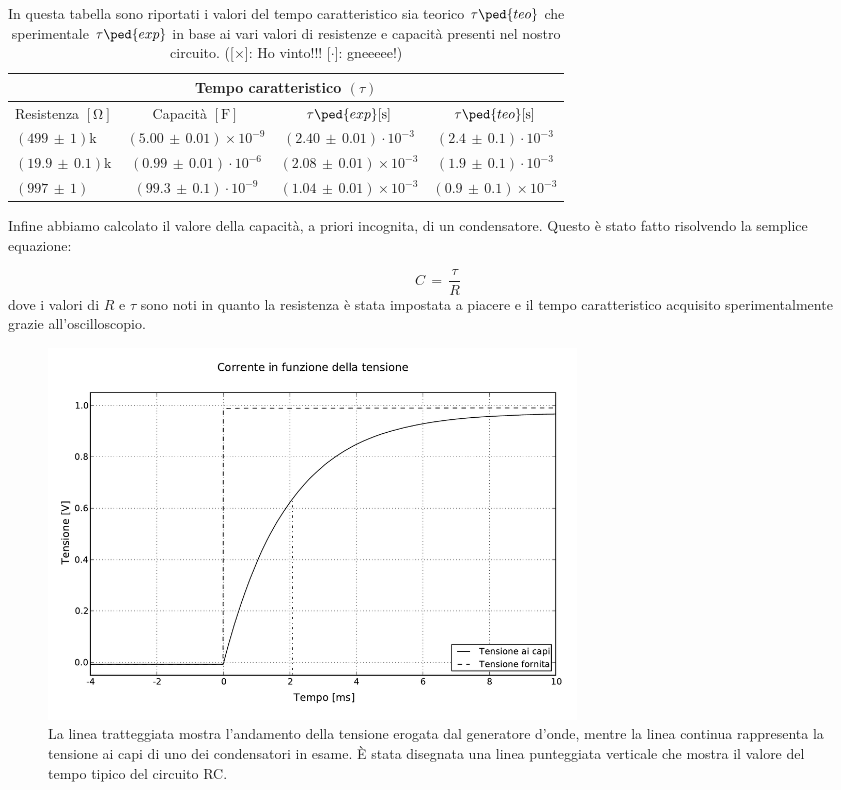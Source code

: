 \begin{table}[H]
  \centering
  \begin{tabular}{l | c c c}
      \multicolumn{4}{c}{\textbf{Tempo caratteristico $(\tau)$}} \\
      \toprule
      Resistenza $[\si{\ohm}]$ & Capacità $[\si{\farad}]$ & $\tau\ped{exp} [\si{\second}]$ & $\tau\ped{teo} [\si{\second}]$ \\
      \midrule
      $(499\,\pm\,1)$k   &  $(5.00\,\pm\,0.01)\times10^{-9}$ 	& $ (2.40\,\pm\,0.01)\cdot10^{-3}$ 		& $(2.4\,\pm\,0.1)\cdot10^{-3}$ \\
      $(19.9\,\pm\,0.1)$k  &  $(0.99\,\pm\,0.01)\cdot10^{-6}$ 		& $ (2.08\,\pm\,0.01)\times10^{-3}$ 	& $(1.9\,\pm\,0.1)\cdot10^{-3}$ \\
      $(997\,\pm\,1)$    &  $(99.3\,\pm\,0.1)\cdot10^{-9}$ 		& $ (1.04\,\pm\,0.01)\times10^{-3}$ 	& $(0.9\,\pm\,0.1)\times10^{-3}$ \\
      \bottomrule
  \end{tabular}
  \caption{In questa tabella sono riportati i valori del tempo caratteristico sia teorico $\tau\ped{teo}$ che sperimentale $\tau\ped{exp}$ in base ai vari valori di resistenze e capacità presenti nel nostro circuito. ([$\times$]: Ho vinto!!! [$\cdot$]: gneeeee!)}
  \label{tab:tris}
\end{table}

Infine abbiamo calcolato il valore della capacità, a priori incognita, di un condensatore. Questo è stato fatto risolvendo la semplice equazione:

\begin{equation}
	C \,=\, \frac{\tau}{R}
	\label{eq:cap}
\end{equation}
%
dove i valori di $R$ e $\tau$ sono noti in quanto la resistenza è stata impostata a piacere e il tempo caratteristico acquisito sperimentalmente grazie all'oscilloscopio.

\begin{figure}
    \includegraphics[width=140mm]{fig.pdf}
    \caption{La linea tratteggiata mostra l'andamento della tensione erogata dal generatore d'onde, mentre la linea continua
      rappresenta la tensione ai capi di uno dei condensatori in esame. È stata disegnata una linea punteggiata verticale che mostra il
      valore del tempo tipico del circuito RC.}
\end{figure}
